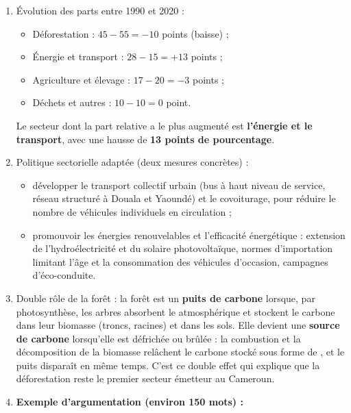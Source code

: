 \documentclass[11pt]{article}
\begin{document}
\begin{corrige}
\begin{enumerate}
\item Évolution des parts entre 1990 et 2020 :
\begin{itemize}
\item Déforestation : $45 - 55 = -10$ points (baisse) ;
\item Énergie et transport : $28 - 15 = +13$ points ;
\item Agriculture et élevage : $17 - 20 = -3$ points ;
\item Déchets et autres : $10 - 10 = 0$ point.
\end{itemize}
Le secteur dont la part relative a le plus augmenté est \textbf{l'énergie et le transport}, avec une hausse de \textbf{13 points de pourcentage}.
\item Politique sectorielle adaptée (deux mesures concrètes) :
\begin{itemize}
\item développer le transport collectif urbain (bus à haut niveau de service, réseau structuré à Douala et Yaoundé) et le covoiturage, pour réduire le nombre de véhicules individuels en circulation ;
\item promouvoir les énergies renouvelables et l'efficacité énergétique : extension de l'hydroélectricité et du solaire photovoltaïque, normes d'importation limitant l'âge et la consommation des véhicules d'occasion, campagnes d'éco-conduite.
\end{itemize}
\item Double rôle de la forêt : la forêt est un \textbf{puits de carbone} lorsque, par photosynthèse, les arbres absorbent le  atmosphérique et stockent le carbone dans leur biomasse (troncs, racines) et dans les sols. Elle devient une \textbf{source de carbone} lorsqu'elle est défrichée ou brûlée : la combustion et la décomposition de la biomasse relâchent le carbone stocké sous forme de , et le puits disparaît en même temps. C'est ce double effet qui explique que la déforestation reste le premier secteur émetteur au Cameroun.
\item \textbf{Exemple d'argumentation (environ 150 mots) :}


\end{enumerate}
\end{corrige}
\end{document}
